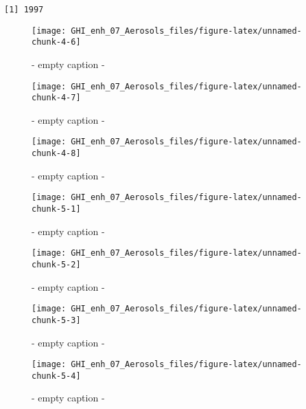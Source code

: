 \documentclass[
  10pt,
  a4paper,oneside]{article}
\begin{document}
\begin{verbatim}
[1] 1997
\end{verbatim}

\begin{figure}[H]

{\centering \texttt{[image: GHI\_enh\_07\_Aerosols\_files/figure-latex/unnamed-chunk-4-6]} 

}

\caption{ - empty caption - }\label{fig:unnamed-chunk-4-6}
\end{figure}
\begin{figure}[H]

{\centering \texttt{[image: GHI\_enh\_07\_Aerosols\_files/figure-latex/unnamed-chunk-4-7]} 

}

\caption{ - empty caption - }\label{fig:unnamed-chunk-4-7}
\end{figure}
\begin{figure}[H]

{\centering \texttt{[image: GHI\_enh\_07\_Aerosols\_files/figure-latex/unnamed-chunk-4-8]} 

}

\caption{ - empty caption - }\label{fig:unnamed-chunk-4-8}
\end{figure}
\begin{figure}[H]

{\centering \texttt{[image: GHI\_enh\_07\_Aerosols\_files/figure-latex/unnamed-chunk-5-1]} 

}

\caption{ - empty caption - }\label{fig:unnamed-chunk-5-1}
\end{figure}
\begin{figure}[H]

{\centering \texttt{[image: GHI\_enh\_07\_Aerosols\_files/figure-latex/unnamed-chunk-5-2]} 

}

\caption{ - empty caption - }\label{fig:unnamed-chunk-5-2}
\end{figure}
\begin{figure}[H]

{\centering \texttt{[image: GHI\_enh\_07\_Aerosols\_files/figure-latex/unnamed-chunk-5-3]} 

}

\caption{ - empty caption - }\label{fig:unnamed-chunk-5-3}
\end{figure}
\begin{figure}[H]

{\centering \texttt{[image: GHI\_enh\_07\_Aerosols\_files/figure-latex/unnamed-chunk-5-4]} 

}

\caption{ - empty caption - }\label{fig:unnamed-chunk-5-4}
\end{figure}
\end{document}

